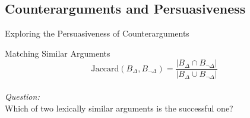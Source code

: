 \documentclass{beamer}
\begin{document}
\subsection{Counterarguments and Persuasiveness}
\begin{frame}{Exploring the Persuasiveness of Counterarguments}
\begin{figure}
\end{figure}
\end{frame}

\begin{frame}{Matching Similar Arguments}\centering
\begin{equation*}
\text{Jaccard}(B_\Delta,B_{\neg\Delta})=\dfrac{|B_\Delta\cap B_{\neg\Delta}|}{|B_\Delta\cup B_{\neg\Delta}|}
\end{equation*}
\vspace{2em}\\
\large{\emph{Question:}\\Which of two lexically similar arguments is the successful one?}
\end{frame}
\end{document}
